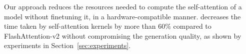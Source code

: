 Our \OURS approach reduces the resources needed to compute the self-attention of a model without finetuning it, in a hardware-compatible manner.  \OURS decreases the time taken by self-attention kernels by more than 60\% compared to FlashAttention-v2 without compromising the generation quality, as shown by experiments in Section~\ref{sec:experiments}. 


%
%
%
%
%
%
%


%
%


%
%
%
%
%
%
%
%
%
%
%



%

%

%

%

%


%


%

%





